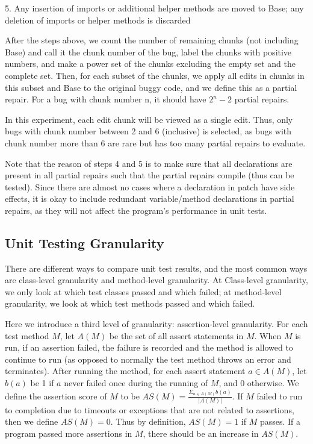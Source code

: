 \documentclass[sigconf, timestamp-false, anonymous=true]{acmart}
\begin{document}
5. Any insertion of imports or additional helper methods are moved to Base; any deletion of imports or helper methods is discarded

After the steps above, we count the number of remaining chunks (not including Base) and call it the chunk number of the bug, label the chunks with positive numbers, and make a power set of the chunks excluding the empty set and the complete set. Then, for each subset of the chunks, we apply all edits in chunks in this subset and Base to the original buggy code, and we define this as a partial repair. For a bug with chunk number n, it should have $2^n-2$ partial repairs. 

In this experiment, each edit chunk will be viewed as a single edit. Thus, only bugs with chunk number between 2 and 6 (inclusive) is selected, as bugs with chunk number more than 6 are rare but has too many partial repairs to evaluate.

Note that the reason of steps 4 and 5 is to make sure that all declarations are present in all partial repairs such that the partial repairs compile (thus can be tested). Since there are almost no cases where a declaration in patch have side effects, it is okay to include redundant variable/method declarations in partial repairs, as they will not affect the program's performance in unit tests. 

\subsection{Unit Testing Granularity}

There are different ways to compare unit test results, and the most common ways are class-level granularity and method-level granularity. At Class-level granularity, we only look at which test classes passed and which failed; at method-level granularity, we look at which test methods passed and which failed.

Here we introduce a third level of granularity: assertion-level granularity. For each test method $M$, let $A(M)$ be the set of all assert statements in $M$. When $M$ is run, if an assertion failed, the failure is recorded and the method is allowed to continue to run (as opposed to normally the test method throws an error and terminates). After running the method, for each assert statement $a\in A(M)$, let $b(a)$ be 1 if $a$ never failed once during the running of $M$, and 0 otherwise. We define the assertion score of $M$ to be $AS(M)=\frac{\Sigma_{a\in A(M)}b(a)}{|A(M)|}$. If $M$ failed to run to completion due to timeouts or exceptions that are not related to assertions, then we define $AS(M)=0$. Thus by definition, $AS(M)=1$ if $M$ passes. If a program passed more assertions in $M$, there should be an increase in $AS(M)$.
\end{document}
